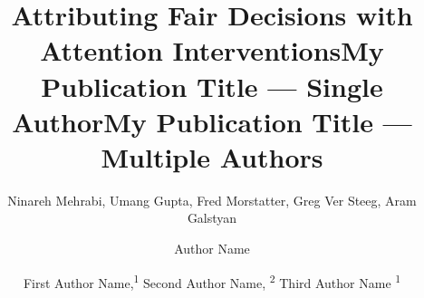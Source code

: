 \documentclass[letterpaper]{article} %
\title{Attributing Fair Decisions with Attention Interventions}
\author{
   Ninareh Mehrabi, Umang Gupta, Fred Morstatter, Greg Ver Steeg, Aram Galstyan
}
\title{My Publication Title --- Single Author}
\author {
    Author Name
}
\title{My Publication Title --- Multiple Authors}
\author {
    First Author Name,\textsuperscript{\rm 1}
    Second Author Name, \textsuperscript{\rm 2}
    Third Author Name \textsuperscript{\rm 1}
}
\begin{document}
\maketitle

\begin{abstract}

\end{abstract}









\end{document}
